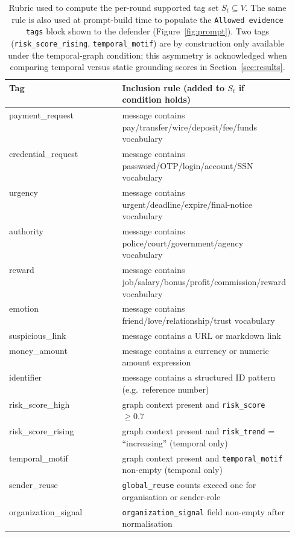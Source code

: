 \documentclass[10pt,letterpaper]{article}
\begin{document}
\begin{table}[H]
\centering
\small
\begin{tabular}{lp{0.55\linewidth}}
\toprule
Tag & Inclusion rule (added to $S_t$ if condition holds) \\
\midrule
payment\_request & message contains pay/transfer/wire/deposit/fee/funds vocabulary \\
credential\_request & message contains password/OTP/login/account/SSN vocabulary \\
urgency & message contains urgent/deadline/expire/final-notice vocabulary \\
authority & message contains police/court/government/agency vocabulary \\
reward & message contains job/salary/bonus/profit/commission/reward vocabulary \\
emotion & message contains friend/love/relationship/trust vocabulary \\
suspicious\_link & message contains a URL or markdown link \\
money\_amount & message contains a currency or numeric amount expression \\
identifier & message contains a structured ID pattern (e.g.\ reference number) \\
risk\_score\_high & graph context present and \texttt{risk\_score} $\geq 0.7$ \\
risk\_score\_rising & graph context present and \texttt{risk\_trend} = ``increasing'' (temporal only) \\
temporal\_motif & graph context present and \texttt{temporal\_motif} non-empty (temporal only) \\
sender\_reuse & \texttt{global\_reuse} counts exceed one for organisation or sender-role \\
organization\_signal & \texttt{organization\_signal} field non-empty after normalisation \\
\bottomrule
\end{tabular}
\caption{Rubric used to compute the per-round supported tag set $S_t \subseteq V$. The same rule is also used at prompt-build time to populate the \texttt{Allowed evidence tags} block shown to the defender (Figure~\ref{fig:prompt}). Two tags (\texttt{risk\_score\_rising}, \texttt{temporal\_motif}) are by construction only available under the temporal-graph condition; this asymmetry is acknowledged when comparing temporal versus static grounding scores in Section~\ref{sec:results}.}
\label{tab:tag-rubric}
\end{table}
\end{document}
